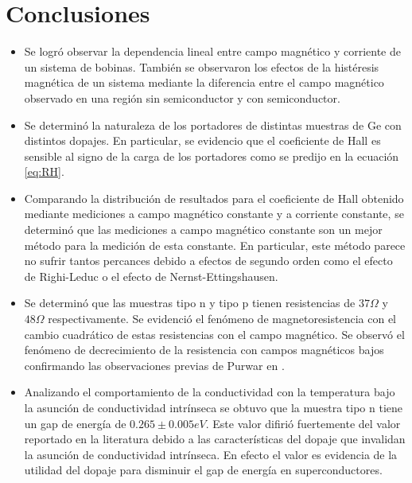 \documentclass[twocolumn,showkeys,preprintnumbers,amsmath,amssymb]{revtex4}
\begin{document}
\section{\label{sec:conc} Conclusiones}

\begin{itemize}

\item Se logró observar la dependencia lineal entre campo magnético y corriente de un sistema de bobinas. También se observaron los efectos de la histéresis magnética de un sistema mediante la diferencia entre el campo magnético observado en una región sin semiconductor y con semiconductor.

\item Se determinó la naturaleza de los portadores de distintas muestras de Ge con distintos dopajes. En particular, se evidencio que el coeficiente de Hall es sensible al signo de la carga de los portadores como se predijo en la ecuación \eqref{eq:RH}. 

\item Comparando la distribución de resultados para el coeficiente de Hall obtenido mediante mediciones a campo magnético constante y a corriente constante, se determinó que las mediciones a campo magnético constante son un mejor método para la medición de esta constante. En particular, este método parece no sufrir tantos percances debido a efectos de segundo orden como el efecto de Righi-Leduc o el efecto de Nernst-Ettingshausen.

\item Se determinó que las muestras tipo n y tipo p tienen resistencias de $37\Omega$ y $48\Omega$ respectivamente. Se evidenció el fenómeno de magnetoresistencia con el cambio cuadrático de estas resistencias con el campo magnético. Se observó el fenómeno de decrecimiento de la resistencia con campos magnéticos bajos confirmando las observaciones previas de Purwar en \cite{bib:Purwar}.

\item Analizando el comportamiento de la conductividad con la temperatura bajo la asunción de conductividad intrínseca se obtuvo que la muestra tipo n tiene un gap de energía de $0.265\pm0.005eV$. Este valor difirió fuertemente del valor reportado en la literatura debido a las características del dopaje que invalidan la asunción de conductividad intrínseca. En efecto el valor es evidencia de la utilidad del dopaje para disminuir el gap de energía en superconductores.

\end{itemize}
\end{document}
